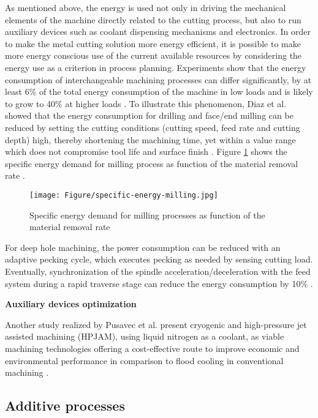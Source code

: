 As mentioned above, the energy is used not only in driving the mechanical elements of the machine directly related to the cutting process, but also to run auxiliary devices such as coolant dispensing mechanisms and electronics. In order to make the metal cutting solution more energy efficient, it is possible to make more energy conscious use of the current available resources by considering the energy use as a criterion in process planning. Experiments show that the energy consumption of interchangeable machining processes can differ significantly, by at least 6\% of the total energy consumption of the machine in low loads and is likely to grow to 40\% at higher loads \cite{Newman2012}. To illustrate this phenomenon, Diaz et al. \cite{Diaz2011} showed that the energy consumption for drilling and face/end milling can be reduced by setting the cutting conditions (cutting speed, feed rate and cutting depth) high, thereby shortening the machining time, yet within a value range which does not compromise tool life and surface finish \cite{Duflou2012}. Figure \ref{fig:specificenergymilling} shows the specific energy demand for milling process as function of the material removal rate \cite{Duflou2012}.

\begin{figure}[h!]
	\centering
	\texttt{[image: Figure/specific-energy-milling.jpg]}
	\caption{Specific energy demand for milling processes as function of the material removal rate}
	\label{fig:specificenergymilling}
\end{figure}

For deep hole machining, the power consumption can be reduced with an adaptive pecking cycle, which executes pecking as needed by sensing cutting load. Eventually, synchronization of the spindle acceleration/deceleration with the feed system during a rapid traverse stage can reduce the energy consumption by 10\% \cite{Duflou2012}.

\textbf{Auxiliary devices optimization}

Another study realized by Pusavec et al. present cryogenic and high-pressure jet assisted machining (HPJAM), using liquid nitrogen as a coolant, as viable machining technologies offering a cost-effective route to improve economic and environmental performance in comparison to flood cooling in conventional machining \cite{Duflou2012}.


\subsection{Additive processes}

